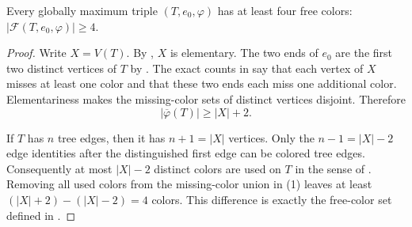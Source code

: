\begin{lemma}
Every globally maximum triple $(T,e_0,\varphi)$ has at least four free
colors: $|\mathcal F(T,e_0,\varphi)|\geq4$.
\end{lemma}
\begin{proof}
Write $X=V(T)$.  By , $X$ is
elementary.  The two
ends of $e_0$ are the first two distinct vertices of $T$ by
.  The exact counts in
 say that each vertex of $X$
misses at least one color and that these two ends each miss one additional
color.  Elementariness makes the missing-color sets of distinct vertices
disjoint.  Therefore
\[
             |\overline\varphi(T)|\geq |X|+2.             \tag{1}
\]

If $T$ has $n$ tree edges, then it has $n+1=|X|$ vertices.  Only the
$n-1=|X|-2$ edge identities after the distinguished first edge can be
colored tree edges.  Consequently at most $|X|-2$ distinct colors are used
on $T$ in the sense of .  Removing all used colors
from the missing-color union in (1) leaves at least
$(|X|+2)-(|X|-2)=4$ colors.  This difference is exactly the free-color set
defined in .
\end{proof}
